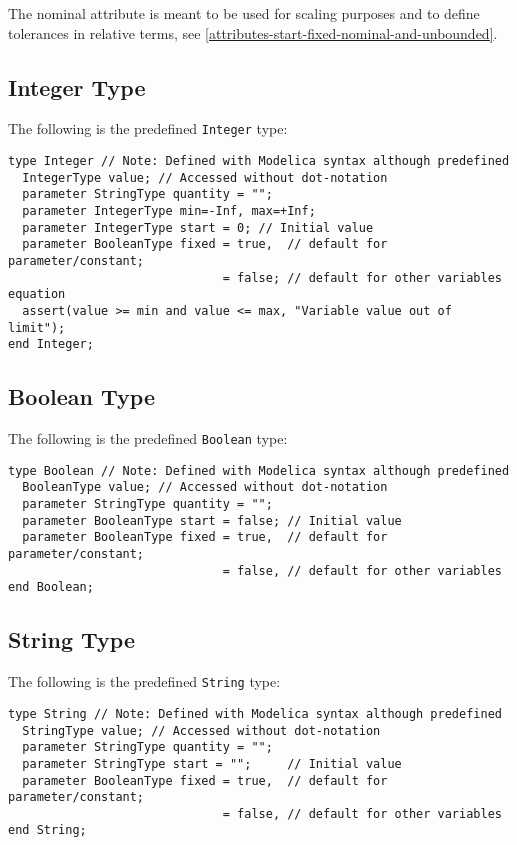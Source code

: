 The nominal attribute is meant to be used for scaling purposes and to
define tolerances in relative terms, see \autoref{attributes-start-fixed-nominal-and-unbounded}.

\subsection{Integer Type}
The following is the predefined \lstinline!Integer! type:
\begin{lstlisting}[language=modelica]
type Integer // Note: Defined with Modelica syntax although predefined
  IntegerType value; // Accessed without dot-notation
  parameter StringType quantity = "";
  parameter IntegerType min=-Inf, max=+Inf;
  parameter IntegerType start = 0; // Initial value
  parameter BooleanType fixed = true,  // default for parameter/constant;
                              = false; // default for other variables
equation
  assert(value >= min and value <= max, "Variable value out of limit");
end Integer;
\end{lstlisting}

\subsection{Boolean Type}
The following is the predefined \lstinline!Boolean! type:
\begin{lstlisting}[language=modelica]
type Boolean // Note: Defined with Modelica syntax although predefined
  BooleanType value; // Accessed without dot-notation
  parameter StringType quantity = "";
  parameter BooleanType start = false; // Initial value
  parameter BooleanType fixed = true,  // default for parameter/constant;
                              = false, // default for other variables
end Boolean;
\end{lstlisting}

\subsection{String Type}

The following is the predefined \lstinline!String! type:
\begin{lstlisting}[language=modelica]
type String // Note: Defined with Modelica syntax although predefined
  StringType value; // Accessed without dot-notation
  parameter StringType quantity = "";
  parameter StringType start = "";     // Initial value
  parameter BooleanType fixed = true,  // default for parameter/constant;
                              = false, // default for other variables
end String;
\end{lstlisting}

